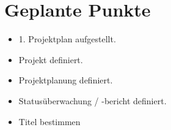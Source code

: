 \section{Geplante Punkte}


\begin{itemize}
  \item 1. Projektplan aufgestellt.
  \item Projekt definiert.
  \item Projektplanung definiert.
  \item Statusüberwachung / -bericht definiert.
  \item Titel bestimmen
\end{itemize}

